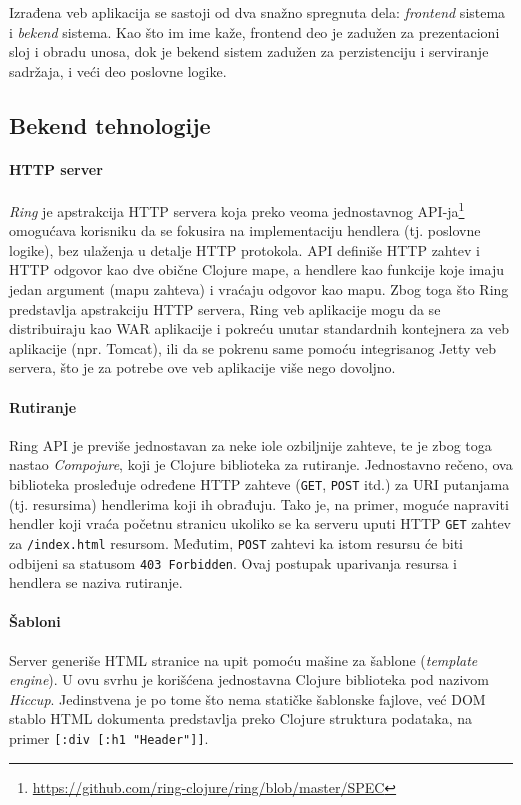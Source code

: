 Izrađena veb aplikacija se sastoji od dva snažno spregnuta dela: \emph{frontend} sistema i \emph{bekend} sistema. Kao što im ime kaže, frontend deo je zadužen za prezentacioni sloj i obradu unosa, dok je bekend sistem zadužen za perzistenciju i serviranje sadržaja, i veći deo poslovne logike.

\subsection{Bekend tehnologije}

\paragraph{HTTP server}
\emph{Ring}\cite{ring} je apstrakcija HTTP servera koja preko veoma jednostavnog API-ja\footnote{\url{https://github.com/ring-clojure/ring/blob/master/SPEC}} omogućava korisniku da se fokusira na implementaciju hendlera (tj. poslovne logike), bez ulaženja u detalje HTTP protokola. API definiše HTTP zahtev i HTTP odgovor kao dve obične Clojure mape, a hendlere kao funkcije koje imaju jedan argument (mapu zahteva) i vraćaju odgovor kao mapu. Zbog toga što Ring predstavlja apstrakciju HTTP servera, Ring veb aplikacije mogu da se distribuiraju kao WAR aplikacije i pokreću unutar standardnih kontejnera za veb aplikacije (npr. Tomcat), ili da se pokrenu same pomoću integrisanog Jetty veb servera, što je za potrebe ove veb aplikacije više nego dovoljno.

\paragraph{Rutiranje}
Ring API je previše jednostavan za neke iole ozbiljnije zahteve, te je zbog toga nastao \emph{Compojure}\cite{compojure}, koji je Clojure biblioteka za rutiranje. Jednostavno rečeno, ova biblioteka prosleđuje određene HTTP zahteve (\texttt{GET}, \texttt{POST} itd.) za URI putanjama (tj. resursima) hendlerima koji ih obrađuju. Tako je, na primer, moguće napraviti hendler koji vraća početnu stranicu ukoliko se ka serveru uputi HTTP \texttt{GET} zahtev za \texttt{/index.html} resursom. Međutim, \texttt{POST} zahtevi ka istom resursu će biti odbijeni sa statusom \texttt{403 Forbidden}. Ovaj postupak uparivanja resursa i hendlera se naziva rutiranje.

\paragraph{Šabloni} Server generiše HTML stranice na upit pomoću mašine za šablone (\textit{template engine}). U ovu svrhu je korišćena jednostavna Clojure biblioteka pod nazivom \emph{Hiccup}\cite{hiccup}. Jedinstvena je po tome što nema statičke šablonske fajlove, već DOM stablo HTML dokumenta predstavlja preko Clojure struktura podataka, na primer \texttt{[:div  [:h1 "Header"]]}.

